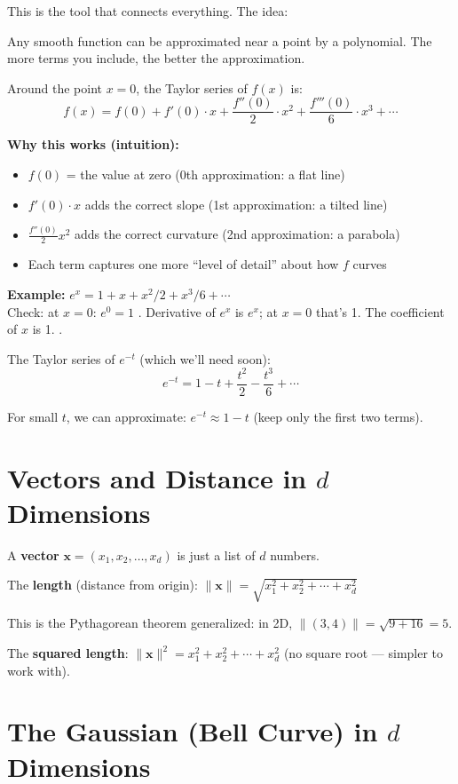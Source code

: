 \documentclass[12pt]{article}
\newcommand{\concept}[2]{\begin{tcolorbox}[colback=blue!3,colframe=blue!40!black,title={#1},breakable]#2\end{tcolorbox}}
\newcommand{\mathnote}[1]{\begin{tcolorbox}[colback=yellow!5,colframe=yellow!60!black,breakable]#1\end{tcolorbox}}
\begin{document}
This is the tool that connects everything. The idea:

\concept{Taylor's insight}{
Any smooth function can be approximated near a point by a polynomial. The more terms you include, the better the approximation.
}

Around the point $x = 0$, the Taylor series of $f(x)$ is:
$$f(x) = f(0) + f'(0)\cdot x + \frac{f''(0)}{2}\cdot x^2 + \frac{f'''(0)}{6}\cdot x^3 + \cdots$$

\mathnote{
\textbf{Why this works (intuition):}
\begin{itemize}
\item $f(0)$ = the value at zero (0th approximation: a flat line)
\item $f'(0)\cdot x$ adds the correct slope (1st approximation: a tilted line)
\item $\frac{f''(0)}{2} x^2$ adds the correct curvature (2nd approximation: a parabola)
\item Each term captures one more ``level of detail'' about how $f$ curves
\end{itemize}

\textbf{Example:} $e^x = 1 + x + x^2/2 + x^3/6 + \cdots$\\
Check: at $x=0$: $e^0 = 1$ \checkmark. Derivative of $e^x$ is $e^x$; at $x=0$ that's 1. The coefficient of $x$ is 1. \checkmark.
}

The Taylor series of $e^{-t}$ (which we'll need soon):
$$e^{-t} = 1 - t + \frac{t^2}{2} - \frac{t^3}{6} + \cdots$$

For small $t$, we can approximate: $e^{-t} \approx 1 - t$ (keep only the first two terms).

\section{Vectors and Distance in $d$ Dimensions}

A \textbf{vector} $\mathbf{x} = (x_1, x_2, \ldots, x_d)$ is just a list of $d$ numbers.

The \textbf{length} (distance from origin): $\|\mathbf{x}\| = \sqrt{x_1^2 + x_2^2 + \cdots + x_d^2}$

This is the Pythagorean theorem generalized: in 2D, $\|(3,4)\| = \sqrt{9+16} = 5$.

The \textbf{squared length}: $\|\mathbf{x}\|^2 = x_1^2 + x_2^2 + \cdots + x_d^2$ (no square root --- simpler to work with).

\section{The Gaussian (Bell Curve) in $d$ Dimensions}
\end{document}
